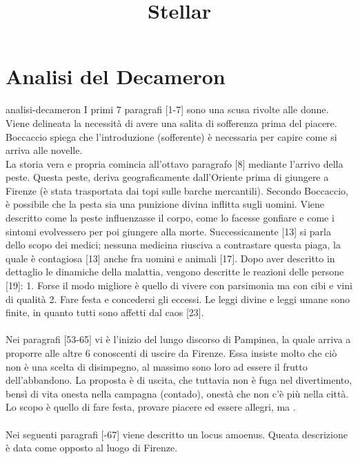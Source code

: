\documentclass[preview]{standalone}
\begin{document}
\title{Stellar}
\genpage

\section{Analisi del Decameron}


\begin{snippet}{analisi-decameron}
    I primi 7 paragrafi [1-7] sono una scusa rivolte alle donne. Viene delineata la necessità di 
    avere una salita di sofferenza prima del piacere.
    Boccaccio spiega che l'introduzione (sofferente) è necessaria per capire come si arriva alle novelle. \\
    La storia vera e propria comincia all'ottavo paragrafo [8] mediante l'arrivo della peste.
    Questa peste, deriva geograficamente dall'Oriente prima di giungere a Firenze
    (è stata trasportata dai topi sulle barche mercantili).
    Secondo Boccaccio, è possibile che la pesta sia una punizione divina inflitta sugli uomini.
    Viene descritto come la peste influenzasse il corpo, come lo facesse gonfiare e come i sintomi evolvessero per poi giungere alla morte.
    Successicamente [13] si parla dello scopo dei medici; nessuna medicina riusciva a contrastare questa piaga, la quale è contagiosa [13]
    anche fra uomini e animali [17].
    Dopo aver descritto in dettaglio le dinamiche della malattia, vengono descritte
    le reazioni delle persone [19]: 1. Forse il modo migliore è quello di vivere con parsimonia ma con cibi e vini di qualità
    2. Fare festa e concedersi gli eccessi.
    Le leggi divine e leggi umane sono finite, in quanto tutti sono affetti dal caos [23].
    \\\\
    Nei paragrafi [53-65] vi è l'inizio del lungo discorso di Pampinea, la quale arriva a proporre alle altre 6 conoscenti
    di uscire da Firenze. Essa insiste molto che ciò non è una scelta di disimpegno,
    al massimo sono loro ad essere il frutto dell'abbandono.
    La proposta è di uscita, che tuttavia non è fuga nel divertimento, bensì di vita onesta nella campagna (contado),
    onestà che non c'è più nella città. Lo scopo è quello di fare festa, provare piacere ed essere allegri,
    ma .
    \\\\
    Nei seguenti paragrafi [-67] viene descritto un locus amoenus.
    Queata descrizione è data come opposto al luogo di Firenze.

\end{snippet}
\end{document}
